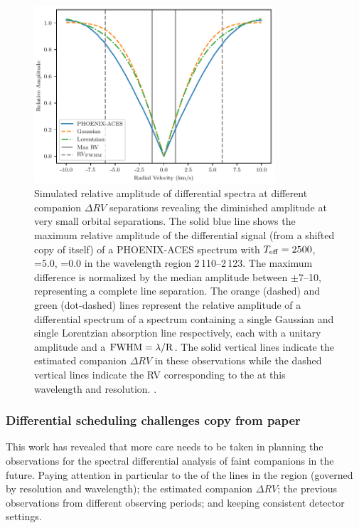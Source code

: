 \begin{figure}
    \centering
    \includegraphics[width=0.8\textwidth]{figures/direct-recovery/rv_diff_final.pdf}
    \caption{Simulated relative amplitude of differential spectra at different companion \(\Delta RV\) separations revealing the diminished amplitude at very small orbital separations. 
    The solid blue line shows the maximum relative amplitude of the differential signal (from a shifted copy of itself) of a {PHOENIX-ACES} spectrum with \(T_{\mathrm{eff}}{}=2500\)\K{}, \logg{}=5.0, \feh{}=0.0 in the wavelength region 2\,110--2\,123\nm{}. 
    The maximum difference is normalized by the median amplitude between \(\pm7\)--10\kmps{}, representing a complete line separation. 
    The orange (dashed) and green (dot-dashed) lines represent the relative amplitude of a differential spectrum of a spectrum containing a single Gaussian and single Lorentzian absorption line respectively, each with a unitary amplitude and a \(\rm {\textrm{FWHM}} = \lambda / R\). 
    The solid vertical lines indicate the estimated companion \(\Delta {RV}\) in these observations while the dashed vertical lines indicate the {RV} corresponding to the {\fwhm} at this wavelength and resolution. .}
    \label{fig:diff_amp}
\end{figure}








\subsubsection{Differential scheduling challenges {copy from paper}}
\label{subsubsec:differential-schedualing}
This work has revealed that more care needs to be taken in planning the observations for the spectral differential analysis of faint companions in the future.
Paying attention in particular to the {\fwhm} of the lines in the region (governed by resolution and wavelength); the estimated companion \(\Delta {RV}\); the previous observations from different observing periods; and keeping consistent detector settings.

